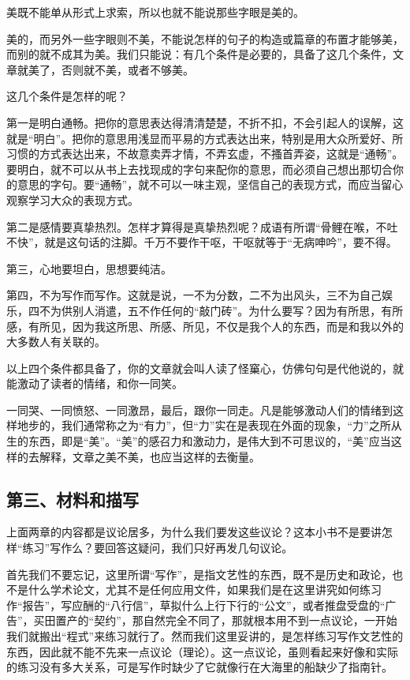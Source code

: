 \documentclass[fontset=fandol,12pt,a5paper]{ctexbook}
\begin{document}
美既不能单从形式上求索，所以也就不能说那些字眼是美的。

美的，而另外一些字眼则不美，不能说怎样的句子的构造或篇章的布置才能够美，而别的就不成其为美。我们只能说：有几个条件是必要的，具备了这几个条件，文章就美了，否则就不美，或者不够美。

这几个条件是怎样的呢？

第一是明白通畅。把你的意思表达得清清楚楚，不折不扣，不会引起人的误解，这就是“明白”。把你的意思用浅显而平易的方式表达出来，特别是用大众所爱好、所习惯的方式表达出来，不故意卖弄才情，不弄玄虚，不搔首弄姿，这就是“通畅”。要明白，就不可以从书上去找现成的字句来配你的意思，而必须自己想出那切合你的意思的字句。要“通畅”，就不可以一味主观，坚信自己的表现方式，而应当留心观察学习大众的表现方式。

第二是感情要真挚热烈。怎样才算得是真挚热烈呢？成语有所谓“骨鲤在喉，不吐不快”，就是这句话的注脚。千万不要作干呕，干呕就等于“无病呻吟”，要不得。

第三，心地要坦白，思想要纯洁。

第四，不为写作而写作。这就是说，一不为分数，二不为出风头，三不为自己娱乐，四不为供别人消遣，五不作任何的“敲门砖”。为什么要写？因为有所思，有所感，有所见，因为我这所思、所感、所见，不仅是我个人的东西，而是和我以外的大多数人有关联的。

以上四个条件都具备了，你的文章就会叫人读了怪窼心，仿佛句句是代他说的，就能激动了读者的情绪，和你一同笑。

一同哭、一同愤怒、一同激昂，最后，跟你一同走。凡是能够激动人们的情绪到这样地步的，我们通常称之为“有力”，但“力”实在是表现在外面的现象，“力”之所从生的东西，即是“美”。“美”的感召力和激动力，是伟大到不可思议的，“美”应当这样的去解释，文章之美不美，也应当这样的去衡量。

\subsection{第三、材料和描写}
上面两章的内容都是议论居多，为什么我们要发这些议论？这本小书不是要讲怎样“练习”写作么？要回答这疑问，我们只好再发几句议论。

首先我们不要忘记，这里所谓“写作”，是指文艺性的东西，既不是历史和政论，也不是什么学术论文，尤其不是任何应用文件，如果我们是在这里讲究如何练习作“报告”，写应酬的“八行信”，草拟什么上行下行的“公文”，或者推盘受盘的“广告”，买田置产的“契约”，那自然完全不同了，那就根本用不到一点议论，一开始我们就搬出“程式”来练习就行了。然而我们这里妥讲的，是怎样练习写作文艺性的东西，因此就不能不先来一点议论（理论）。这一点议论，虽则看起来好像和实际的练习没有多大关系，可是写作时缺少了它就像行在大海里的船缺少了指南针。
\end{document}
